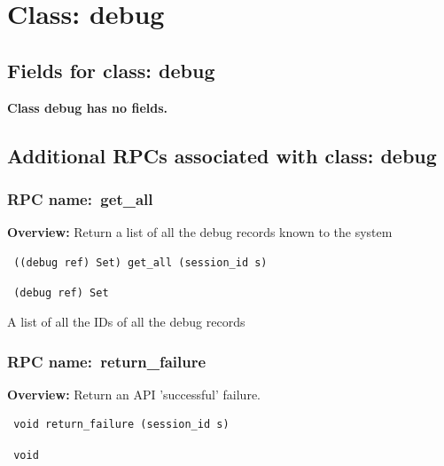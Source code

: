 \vspace{1cm}
\newpage
\section{Class: debug}
\subsection{Fields for class: debug}
{\bf Class debug has no fields.}
\subsection{Additional RPCs associated with class: debug}
\subsubsection{RPC name:~get\_all}

{\bf Overview:} 
Return a list of all the debug records known to the system

\begin{verbatim} ((debug ref) Set) get_all (session_id s)\end{verbatim}


\vspace{0.3cm}

{\tt 
(debug ref) Set
}


A list of all the IDs of all the debug records
\vspace{0.3cm}
\vspace{0.3cm}
\vspace{0.3cm}
\subsubsection{RPC name:~return\_failure}

{\bf Overview:} 
Return an API 'successful' failure.

\begin{verbatim} void return_failure (session_id s)\end{verbatim}


\vspace{0.3cm}

{\tt 
void
}



\vspace{0.3cm}
\vspace{0.3cm}
\vspace{0.3cm}
